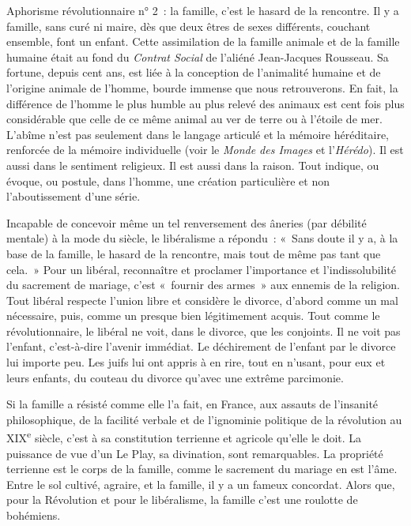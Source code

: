 \documentclass[french,twoside]{book} %
\begin{document}
Aphorisme révolutionnaire n° 2 : la famille, c’est le hasard de la rencontre. Il y a famille, sans curé ni maire, dès que deux êtres de sexes différents, couchant ensemble, font un enfant. Cette assimilation de la famille animale et de la famille humaine était au fond du {\itshape Contrat Social} de l’aliéné Jean-Jacques Rousseau. Sa fortune, depuis cent ans, est liée à la conception de l’animalité humaine et de l’origine animale de l’homme, bourde immense que nous retrouverons. En fait, la différence de l’homme le plus humble au plus relevé des animaux est cent fois plus considérable que celle de ce même animal au ver de terre ou à l’étoile de mer. L’abîme n’est pas seulement dans le langage articulé et la mémoire héréditaire, renforcée de la mémoire individuelle (voir le {\itshape Monde des Images} et l’{\itshape Hérédo}). Il est aussi dans le sentiment religieux. Il est aussi dans la raison. Tout indique, ou évoque, ou postule, dans l’homme, une création particulière et non l’aboutissement d’une série.\par
Incapable de concevoir même un tel renversement des âneries (par débilité mentale) à la mode du siècle, le libéralisme a répondu : « Sans doute il y a, à la base de la famille, le hasard de la rencontre, mais tout de même pas tant que cela. » Pour un libéral, reconnaître et proclamer l’importance et l’indissolubilité du sacrement de mariage, c’est « fournir des armes » aux ennemis de la religion. Tout libéral respecte l’union libre et considère le divorce, d’abord comme un mal nécessaire, puis, comme un presque bien légitimement acquis. Tout comme le révolutionnaire, le libéral ne voit, dans le divorce, que les conjoints. Il ne voit pas l’enfant, c’est-à-dire l’avenir immédiat. Le déchirement de l’enfant par le divorce lui importe peu. Les juifs lui ont appris à en rire, tout en n’usant, pour eux et leurs enfants, du couteau du divorce qu’avec une extrême parcimonie.\par
Si la famille a résisté comme elle l’a fait, en France, aux assauts de l’insanité philosophique, de la facilité verbale et de l’ignominie politique de la révolution au XIX\textsuperscript{e} siècle, c’est à sa constitution terrienne et agricole qu’elle le doit. La puissance de vue d’un Le Play, sa divination, sont remarquables. La propriété terrienne est le corps de la famille, comme le sacrement du mariage en est l’âme. Entre le sol cultivé, agraire, et la famille, il y a un fameux concordat. Alors que, pour la Révolution et pour le libéralisme, la famille c’est une roulotte de bohémiens.\par
\end{document}
